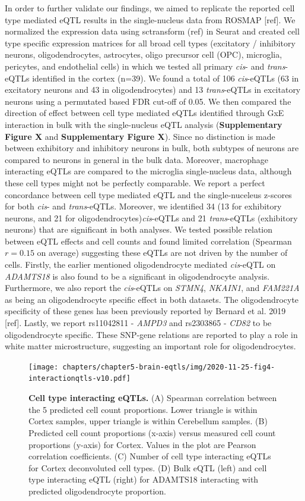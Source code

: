 In order to further validate our findings, we aimed to replicate the reported cell type mediated eQTL results in the single-nucleus data from ROSMAP [ref]. We normalized the expression data using sctransform (ref) in Seurat and created cell type specific expression matrices for all broad cell types (excitatory / inhibitory neurons, oligodendrocytes, astrocytes, oligo precursor cell (OPC), microglia, pericytes, and endothelial cells) in which we tested all primary \emph{cis}- and \emph{trans}-eQTLs identified in the cortex (n=39). We found a total of 106 \emph{cis}-eQTLs (63 in excitatory neurons and 43 in oligodendrocytes) and 13 \emph{trans}-eQTLs in excitatory neurons using a permutated based FDR cut-off of 0.05. We then compared the direction of effect between cell type mediated eQTLs identified through GxE interaction in bulk with the single-nucleus eQTL analysis (\textbf{Supplementary Figure X} and \textbf{Supplementary Figure X}). Since no distinction is made between exhibitory and inhibitory neurons in bulk, both subtypes of neurons are compared to neurons in general in the bulk data. Moreover, macrophage interacting eQTLs are compared to the microglia single-nucleus data, although these cell types might not be perfectly comparable. We report a perfect concordance between cell type mediated eQTL and the single-nuceleus z-scores for both \emph{cis}- and \emph{trans}-eQTLs. Moreover, we identified 34 (13 for exhibitory neurons, and 21 for oligodendrocytes)\emph{cis}-eQTLs and 21 \emph{trans}-eQTLs (exhibitory neurons) that are significant in both analyses. We tested possible relation between eQTL effects and cell counts and found limited correlation (Spearman $r = 0.15$ on average) suggesting these eQTLs are not driven by the number of cells. Firstly, the earlier mentioned oligodendrocyte mediated \emph{cis}-eQTL on \emph{ADAMTS18} is also found to be a significant in oligodendrocyte analysis. Furthermore, we also report the \emph{cis}-eQTLs on \emph{STMN4}, \emph{NKAIN1}, and \emph{FAM221A} as being an oligodendrocyte specific effect in both datasets. The oligodendrocyte specificity of these genes has been previously reported by Bernard et al. 2019 [ref]. Lastly, we report rs11042811 - \emph{AMPD3} and rs2303865 - \emph{CD82} to be oligodendrocyte specific. These SNP-gene relations are reported to play a role in white matter microstructure, suggesting an important role for oligodendrocytes.

\begin{figure}[H]
	\texttt{[image: chapters/chapter5-brain-eqtls/img/2020-11-25-fig4-interactionqtls-v10.pdf]}
	\caption{\textbf{Cell type interacting eQTLs.} (A) Spearman correlation between the 5 predicted cell count proportions. Lower triangle is within Cortex samples, upper triangle is within Cerebellum samples. (B) Predicted cell count proportions (x-axis) versus measured cell count proportions (y-axis) for Cortex. Values in the plot are Pearson correlation coefficients. (C) Number of cell type interacting eQTLs for Cortex deconvoluted cell types. (D) Bulk eQTL (left) and cell type interacting eQTL (right) for ADAMTS18 interacting with predicted oligodendrocyte proportion.}
	\end{figure}

